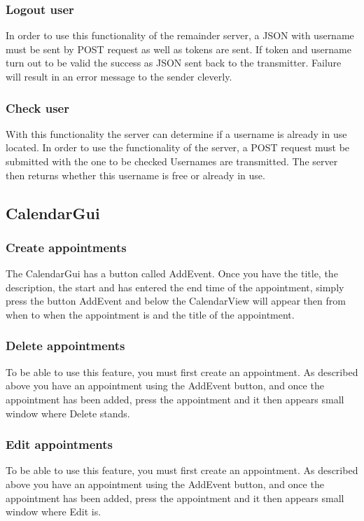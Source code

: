 \documentclass[12pt]{scrartcl}
\begin{document}
    \subsubsection{Logout user}
        In order to use this functionality of the remainder server, a JSON with username must be sent by POST request
        as well as tokens are sent. If token and username turn out to be valid
        the success as JSON sent back to the transmitter. Failure will result in an error message to the sender
        cleverly.
    \subsubsection{Check user}
        With this functionality the server can determine if a username is already in use
        located. In order to use the functionality of the server, a POST request must be submitted with the one to be checked
        Usernames are transmitted.
        The server then returns whether this username is free or already in use.

    \subsection{CalendarGui}
    \subsubsection{Create appointments}
        The CalendarGui has a button called AddEvent. Once you have the title, the description, the start and
        has entered the end time of the appointment, simply press the button AddEvent and below the CalendarView will appear
        then from when to when the appointment is and the title of the appointment.
        
    \subsubsection{Delete appointments}
        To be able to use this feature, you must first create an appointment. As described above you have an appointment
        using the AddEvent button, and once the appointment has been added, press the appointment and
        it then appears small window where Delete stands.
        
    \subsubsection{Edit appointments}
        To be able to use this feature, you must first create an appointment. As described above you have an appointment
        using the AddEvent button, and once the appointment has been added, press the appointment and
        it then appears small window where Edit is.
\end{document}
